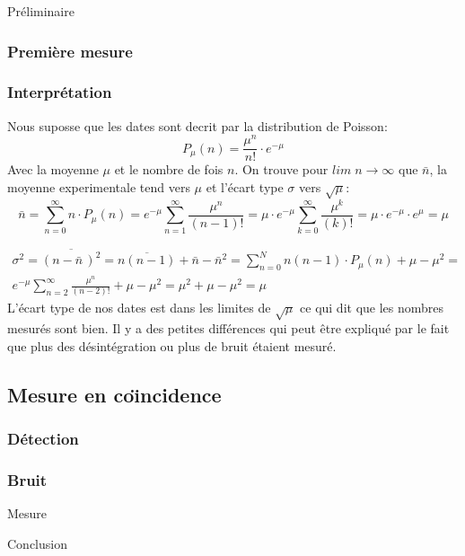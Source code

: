 \documentclass[a4paper,11pt,liststotocnumbered,bibtotocnumbered]{scrartcl}
\begin{document}
\begin{section}{Préliminaire}
   
   \subsubsection{Première mesure}
   

   \subsubsection{Interprétation} 
    Nous suposse que les dates sont decrit par la distribution de Poisson:
    \begin{equation*}
     P_{\mu}(n)=\frac{\mu^n}{n!}\cdot e^{-{\mu}}
    \end{equation*}
    Avec la moyenne $\mu$ et le nombre de fois $n$. On trouve pour $lim \; n {\rightarrow}  \infty$ que $\bar{n}$, la moyenne experimentale tend vers $\mu$ et l'écart type $\sigma$ vers $\sqrt{\mu}$:
    \begin{equation*}
     \bar{n}=\sum_{n=0}^{\infty} n \cdot P_{\mu}(n)=e^{-{\mu}}\sum_{n=1}^{\infty}\frac{\mu^n}{(n-1)!}=\mu \cdot  e^{-{\mu}}\sum_{k=0}^{\infty}\frac{\mu^k}{(k)!}=\mu \cdot e^{-{\mu}}\cdot  e^{{\mu}}=\mu
    \end{equation*}

    \begin{equation*}
     \begin{split}
      \sigma^2=\overline{(n-\bar{n}\,)^2}=\overline{n(n-1)}+\bar{n}-{\bar{n}}^2=\sum_{n=0} ^{N} n (n-1)\cdot P_{\mu}(n)+\mu -\mu^2=\\
      e^{-{\mu}}\sum_{n=2}^{\infty}\frac{\mu^n}{(n-2)!}+\mu -\mu^2=\mu^2+ \mu -\mu^2=\mu
     \end{split}
    \end{equation*}
    L'écart type de nos dates est dans les limites de $\sqrt{\mu}$ ce qui dit que les nombres mesurés sont bien. Il y a des petites différences qui peut être expliqué par le fait que plus des désintégration ou plus de bruit étaient mesuré.
   
  

  \subsection{Mesure en co\"{\i}ncidence}
   \subsubsection{Détection}
 

   \subsubsection{Bruit}
 \end{section}


 \begin{section}{Mesure}
  
 \end{section}


 \begin{section}{Conclusion}
  
 \end{section}
 
 \begin{appendix}
  
    

  \listoffigures  
 \end{appendix}
\end{document}
